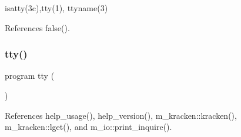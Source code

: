 isatty(3c),tty(1), ttyname(3) 

References false().

\mbox{\label{__tty_8f90_a860b0e8d8a94aa5cc835f634fdff3bd8}} 
\subsubsection{\texorpdfstring{tty()}{tty()}}
{\footnotesize\ttfamily program tty (\begin{DoxyParamCaption}{ }\end{DoxyParamCaption})}



References help\+\_\+usage(), help\+\_\+version(), m\+\_\+kracken\+::kracken(), m\+\_\+kracken\+::lget(), and m\+\_\+io\+::print\+\_\+inquire().


